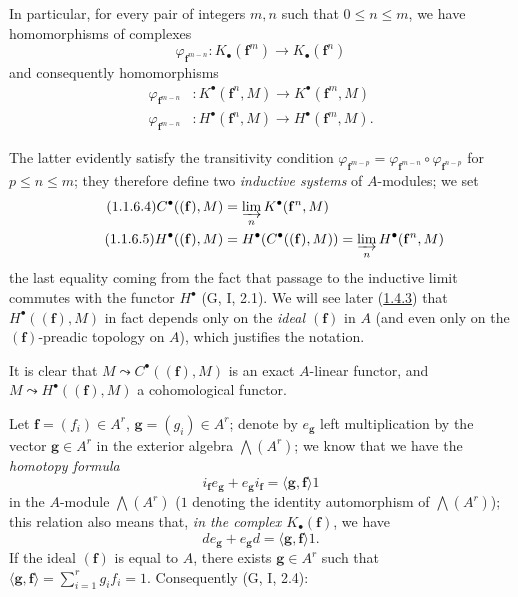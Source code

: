 \begin{env}[1.1.6]
\label{III.1.1.6}
In particular, for every pair of integers $m,n$ such that $0\leq n\leq m$,
we have homomorphisms of complexes
\begin{equation}
\label{III.1.1.6.1}
\tag{1.1.6.1}
\varphi_{\mathbf f^{m-n}}:K_\bullet(\mathbf f^m)\longrightarrow
K_\bullet(\mathbf f^n)
\end{equation}
and consequently homomorphisms
\begin{align}
\label{III.1.1.6.2}
\tag{1.1.6.2}
\varphi_{\mathbf f^{m-n}} &:K^\bullet(\mathbf f^n,M)\longrightarrow
K^\bullet(\mathbf f^m,M)\\
\label{III.1.1.6.3}
\tag{1.1.6.3}
\varphi_{\mathbf f^{m-n}} &:H^\bullet(\mathbf f^n,M)\longrightarrow
H^\bullet(\mathbf f^m,M).
\end{align}

The latter evidently satisfy the transitivity condition
$\varphi_{\mathbf f^{m-p}}=
\varphi_{\mathbf f^{m-n}}\circ\varphi_{\mathbf f^{n-p}}$ for $p\leq n\leq m$;
they therefore define two \emph{inductive systems} of $A$-modules; we set
\begin{align}
\label{III.1.1.6.4}
\tag{1.1.6.4}
C^\bullet((\mathbf f),M)&=\varinjlim_n K^\bullet(\mathbf f^n,M)\\
\label{III.1.1.6.5}
\tag{1.1.6.5}
H^\bullet((\mathbf f),M)&=H^\bullet(C^\bullet((\mathbf f),M))
=\varinjlim_n H^\bullet(\mathbf f^n,M)
\end{align}
the last equality coming from the fact that passage to the inductive limit
commutes with the functor $H^\bullet$ (G, I, 2.1). We will see later
(\hyperref[III.1.4.3]{1.4.3}) that $H^\bullet((\mathbf f),M)$ in fact
depends only on the \emph{ideal $(\mathbf f)$} in $A$ (and even only on the
$(\mathbf f)$-preadic topology on $A$), which justifies the notation.

It is clear that $M\leadsto C^\bullet((\mathbf f),M)$ is an exact
$A$-linear functor, and $M\leadsto H^\bullet((\mathbf f),M)$ a
cohomological functor.
\end{env}

\begin{env}[1.1.7]
\label{III.1.1.7}
Let $\mathbf f=(f_i)\in A^r$, $\mathbf g=(g_i)\in A^r$; denote by
$e_{\mathbf g}$ left multiplication by the vector
$\mathbf g\in A^r$ in the exterior algebra $\bigwedge(A^r)$; we know that
we have the \emph{homotopy formula}
\begin{equation}
\label{III.1.1.7.1}
\tag{1.1.7.1}
i_{\mathbf f}e_{\mathbf g}+e_{\mathbf g}i_{\mathbf f}
=\langle\mathbf g,\mathbf f\rangle 1
\end{equation}
in the $A$-module $\bigwedge(A^r)$ ($1$ denoting the identity automorphism
of $\bigwedge(A^r)$);
this relation also means that, \emph{in the complex
$K_\bullet(\mathbf f)$}, we have
\begin{equation}
\label{III.1.1.7.2}
\tag{1.1.7.2}
de_{\mathbf g}+e_{\mathbf g}d=\langle\mathbf g,\mathbf f\rangle 1.
\end{equation}
If the ideal $(\mathbf f)$ is equal to $A$, there exists $\mathbf g\in A^r$
such that $\langle\mathbf g,\mathbf f\rangle=\sum_{i=1}^r g_if_i=1$.
Consequently (G, I, 2.4):
\end{env}

